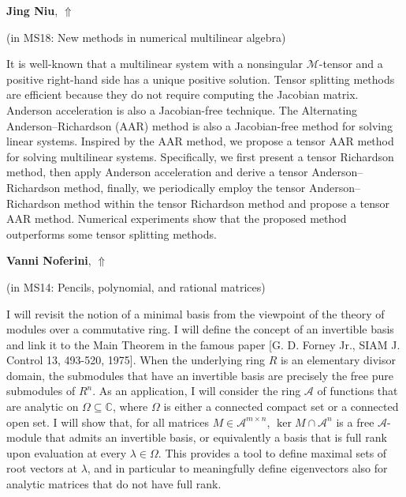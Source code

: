 \documentclass[ILAS2025-program.tex]{subfiles}
\begin{document}
\hypertarget{down0148}{}\begin{ilasabstract}
    
\textbf{Jing Niu},  \hfill \hyperlink{up0148}{$\Uparrow$}
    
    
(in {\color{mstitle}MS18: New methods in numerical multilinear algebra})
        
\mtskip
    It is well-known that a multilinear system with a nonsingular $ \mathcal{M} $-tensor and a positive right-hand side has a unique positive solution.
Tensor splitting methods are efficient because they do not require computing the Jacobian matrix.
Anderson acceleration is also a Jacobian-free technique. 
The Alternating Anderson--Richardson (AAR) method is also a Jacobian-free method for solving linear systems.
Inspired by the AAR method,
we propose a tensor AAR method for solving multilinear systems.
Specifically, we first present a tensor Richardson method, then apply Anderson acceleration and derive a tensor Anderson--Richardson method, finally, we periodically employ the tensor Anderson--Richardson method within the tensor Richardson method and propose a tensor AAR method.
Numerical experiments show that the proposed method outperforms some tensor splitting methods.

\end{ilasabstract}
    

\hypertarget{down0213}{}\begin{ilasabstract}
    
\textbf{Vanni Noferini},  \hfill \hyperlink{up0213}{$\Uparrow$}
    
    
(in {\color{mstitle}MS14: Pencils, polynomial, and rational matrices})
        
\mtskip
    I will revisit the notion of a minimal basis from the viewpoint of the theory of modules over a commutative ring. I will define the concept of an invertible basis and link it to the Main Theorem in the famous paper [G. D. Forney Jr., SIAM J. Control 13, 493-520, 1975]. When the underlying ring $R$ is an elementary divisor domain, the submodules that have an invertible basis are precisely the free pure submodules of $R^n$. As an application, I will consider the ring $\mathcal{A}$ of functions that are analytic on $\Omega \subseteq \mathbb{C}$, where $\Omega$ is either a connected compact set or a connected open set. I will show that, for all matrices $M \in \mathcal{A}^{m \times n}$, $\ker M \cap \mathcal{A}^n$ is a free $\mathcal{A}$-module that admits an invertible basis, or equivalently a basis that is full rank upon evaluation at every $\lambda \in \Omega$. This provides a tool to define maximal sets of root vectors at $\lambda$, and in particular to meaningfully define eigenvectors also for analytic matrices that do not have full rank.

\end{ilasabstract}
    
\end{document}
